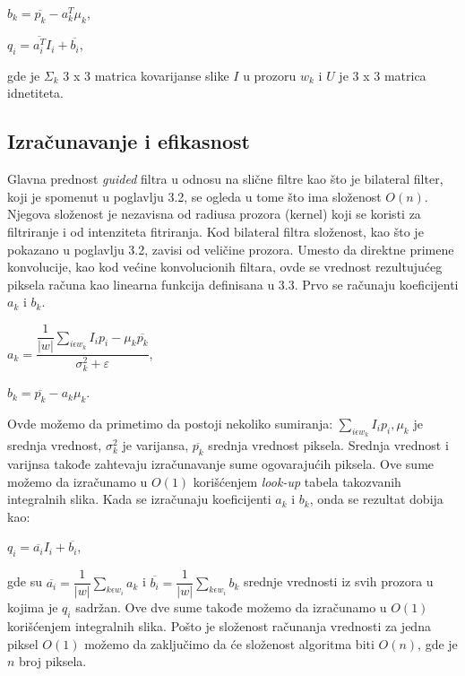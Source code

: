 \documentclass[a4paper,12pt,titlepage]{article}
\begin{document}
\begin{center}
	$b_k = \overline{p_k} - a_k^T \mu_k$,
\end{center}

\begin{center}
	$q_i = \overline{a_i^T} I_i + \overline{b_i}$,
\end{center}

gde je $\Sigma_k$ 3 x 3 matrica kovarijanse slike $I$ u prozoru $w_k$ i $U$ je 3 x 3 matrica idnetiteta.

\subsection{Izračunavanje i efikasnost}%

Glavna prednost \emph{guided} filtra u odnosu na slične filtre kao što je bilateral filter, koji je spomenut u poglavlju 3.2, se ogleda u tome što ima složenost $O(n)$. Njegova složenost je nezavisna od radiusa prozora (kernel) koji se koristi za filtriranje i od intenziteta fitriranja. Kod bilateral filtra složenost, kao što je pokazano u poglavlju 3.2, zavisi od veličine prozora. Umesto da direktne primene konvolucije, kao kod većine konvolucionih filtara, ovde se vrednost rezultujućeg piksela računa kao linearna funkcija definisana u 3.3. Prvo se računaju koeficijenti $a_k$ i $b_k$.

\begin{center}
	$a_k = \dfrac{\dfrac{1}{|w|} \sum_{i \epsilon w_k} I_ip_i - \mu_k \overline{p_k}}{\sigma_k^2 + \varepsilon}$,
\end{center}

\begin{center}
	$b_k = \overline{p_k} - a_k \mu_k$.
\end{center}

Ovde možemo da primetimo da postoji nekoliko sumiranja:  $\sum_{i \epsilon w_k} I_ip_i, \mu_k$ je srednja vrednost, $\sigma_k^2$ je varijansa, $\overline{p_k}$ srednja vrednost piksela. Srednja vrednost i varijnsa takođe zahtevaju izračunavanje sume ogovarajućih piksela. Ove sume možemo da izračunamo u $O(1)$ korišćenjem \emph{look-up} tabela takozvanih integralnih slika. Kada se izračunaju koeficijenti $a_k$ i $b_k$, onda se rezultat dobija kao:

 \begin{center}
	$q_i = \overline{a_i}I_i + \overline{b_i}$,
\end{center}

gde su $\overline{a_i} = \dfrac{1}{|w|}\sum_{k \epsilon w_i} a_k$ i $\overline{b_i} = \dfrac{1}{|w|}\sum_{k \epsilon w_i} b_k$ srednje vrednosti iz svih prozora u kojima je $q_i$ sadržan. Ove dve sume takođe možemo da izračunamo u $O(1)$ korišćenjem  integralnih slika. Pošto je složenost računanja vrednosti za jedna piksel $O(1)$ možemo da zaključimo da  će složenost algoritma biti $O(n)$, gde je $n$ broj piksela.
\end{document}
